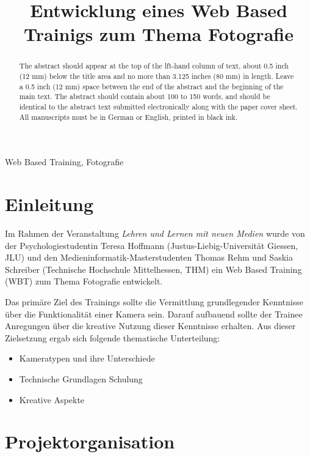 \documentclass{article}
\title{Entwicklung eines Web Based Trainigs zum Thema Fotografie}
\begin{document}
%
\maketitle
%
\begin{abstract}
The abstract should appear at the top of the lft-hand column of text, about
0.5 inch (12 mm) below the title area and no more than 3.125 inches (80 mm) in
length.  Leave a 0.5 inch (12 mm) space between the end of the abstract and the
beginning of the main text.  The abstract should contain about 100 to 150
words, and should be identical to the abstract text submitted electronically
along with the paper cover sheet. All manuscripts must be in German or English, printed in black ink.
\end{abstract}
%
\begin{keywords}
Web Based Training, Fotografie
\end{keywords}
%
\section{Einleitung}
\label{sec:intro}

Im Rahmen der Veranstaltung \emph{Lehren und Lernen mit neuen Medien} wurde von der Psychologiestudentin Teresa Hoffmann (Justus-Liebig-Universit\"at Giessen, JLU) und den Medieninformatik-Masterstudenten Thomas Rehm und Saskia Schreiber (Technische Hochschule Mittelhessen, THM) ein Web Based Training (WBT) zum Thema Fotografie entwickelt.

Das prim\"are Ziel des Trainings sollte die Vermittlung grundlegender Kenntnisse \"uber die Funktionalit\"at einer Kamera sein. Darauf aufbauend sollte der Trainee Anregungen \"uber die kreative Nutzung dieser Kenntnisse erhalten.
Aus dieser Zielsetzung ergab sich folgende thematische Unterteilung:



\begin{itemize}
\item Kameratypen und ihre Unterschiede
\item Technische Grundlagen Schulung
\item Kreative Aspekte

\end{itemize}


\section{Projektorganisation}
\label{sec:orga}
\end{document}
